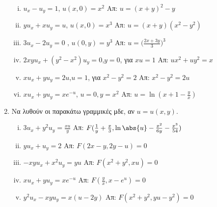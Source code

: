 \begin{enumerate}
 \begin{enumerate}[i)]
   \item $u_{x}-u_{y}=1$, \quad $u(x,0)=x^{2}$ \hfill Απ: $u=(x+y)^{2}-y$
   \item $yu_{x}+xu_{y}=u$, \quad $u(x,0)=x^{3}$ \hfill Απ: $u=(x+y)(x^{2}-y^{2})$
   \item $3u_{x}-2u_{y}=0$ , \quad $u(0,y)=y^{3}$ \hfill Απ: $u=\bigl(\frac{2x+3y}{3}\bigr)^{3}$
   \item $2xyu_{x}+(y^{2}-x^{2})u_{y}=0$,\quad $y=0$, για $xu=1$ \hfill Απ: $ux^{2}+uy^{2}=x$
   \item $xu_{x}+yu_{y}=2u$,\quad $u=1$, για $x^{2}-y^{2}=2$ \hfill Απ: $x^{2}-y^{2}=2u$
   \item $xu_{x}+yu_{y}=xe^{-u}$, \quad $u=0, y=x^{2}$ \hfill Απ: $u=\ln(x+1-\frac{y}{x})$
  
 \end{enumerate}  
  

\item Να λυθούν οι παρακάτω γραμμικές μδε, αν $u=u(x,y)$.

 \begin{enumerate}[i)]
   \item $3u_{x}+y^{2}u_{y}=\frac{xu}{y}$ \hfill Απ: $F(\frac{1}{y}+\frac{x}{3},\ln\abs{u}-\frac{x^{2}}{6y}-\frac{x^{3}}{54})$
   \item $yu_{x}+u_{y}=2$ \hfill Απ: $F(2x-y,2y-u)=0$
   \item $-xyu_{x}+x^{2}u_{y}=yu$ \hfill Απ: $F(x^{2}+y^{2},xu)=0$
   \item $xu_{x}+yu_{y}=xe^{-u}$ \hfill Απ: $F(\frac{y}{x},x-e^{u})=0$
   \item $y^{2}u_{x}-xyu_{y}=x(u-2y)$ \hfill Απ: $F(x^{2}+y^{2},yu-y^{2})=0$




 \end{enumerate}





\end{enumerate}


